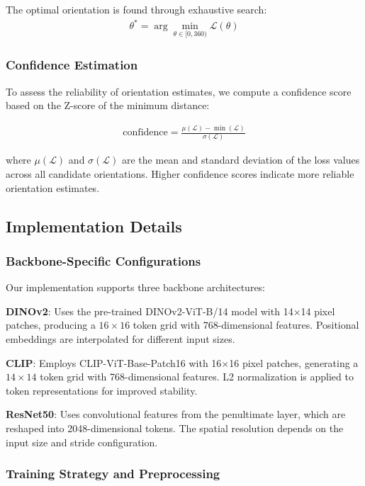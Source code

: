 The optimal orientation is found through exhaustive search:
\begin{align}
\theta^* = \arg\min_{\theta \in [0, 360)} \mathcal{L}(\theta)
\end{align}

\subsubsection{Confidence Estimation}

To assess the reliability of orientation estimates, we compute a confidence score based on the Z-score of the minimum distance:

\begin{align}
\text{confidence} = \frac{\mu(\mathcal{L}) - \min(\mathcal{L})}{\sigma(\mathcal{L})}
\end{align}

where $\mu(\mathcal{L})$ and $\sigma(\mathcal{L})$ are the mean and standard deviation of the loss values across all candidate orientations. Higher confidence scores indicate more reliable orientation estimates.

\subsection{Implementation Details}

\subsubsection{Backbone-Specific Configurations}

Our implementation supports three backbone architectures:

\textbf{DINOv2}: Uses the pre-trained DINOv2-ViT-B/14 model with 14×14 pixel patches, producing a $16 \times 16$ token grid with 768-dimensional features. Positional embeddings are interpolated for different input sizes.

\textbf{CLIP}: Employs CLIP-ViT-Base-Patch16 with 16×16 pixel patches, generating a $14 \times 14$ token grid with 768-dimensional features. L2 normalization is applied to token representations for improved stability.

\textbf{ResNet50}: Uses convolutional features from the penultimate layer, which are reshaped into 2048-dimensional tokens. The spatial resolution depends on the input size and stride configuration.

\subsubsection{Training Strategy and Preprocessing}

